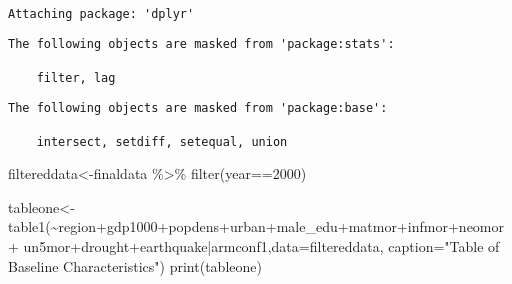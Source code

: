 \documentclass[
  letterpaper,
  DIV=11,
  numbers=noendperiod]{scrartcl}
\newenvironment{Shaded}{\begin{snugshade}}{\end{snugshade}}
\newcommand{\AttributeTok}[1]{\textcolor[rgb]{0.40,0.45,0.13}{#1}}
\newcommand{\DecValTok}[1]{\textcolor[rgb]{0.68,0.00,0.00}{#1}}
\newcommand{\FunctionTok}[1]{\textcolor[rgb]{0.28,0.35,0.67}{#1}}
\newcommand{\NormalTok}[1]{\textcolor[rgb]{0.00,0.23,0.31}{#1}}
\newcommand{\OtherTok}[1]{\textcolor[rgb]{0.00,0.23,0.31}{#1}}
\newcommand{\SpecialCharTok}[1]{\textcolor[rgb]{0.37,0.37,0.37}{#1}}
\newcommand{\StringTok}[1]{\textcolor[rgb]{0.13,0.47,0.30}{#1}}
\begin{document}
\begin{verbatim}

Attaching package: 'dplyr'
\end{verbatim}

\begin{verbatim}
The following objects are masked from 'package:stats':

    filter, lag
\end{verbatim}

\begin{verbatim}
The following objects are masked from 'package:base':

    intersect, setdiff, setequal, union
\end{verbatim}

\begin{Shaded}
\begin{Highlighting}[]
\NormalTok{filtereddata}\OtherTok{\textless{}{-}}\NormalTok{finaldata }\SpecialCharTok{\%\textgreater{}\%} \FunctionTok{filter}\NormalTok{(year}\SpecialCharTok{==}\DecValTok{2000}\NormalTok{)}

\NormalTok{tableone}\OtherTok{\textless{}{-}}\FunctionTok{table1}\NormalTok{(}\SpecialCharTok{\textasciitilde{}}\NormalTok{region}\SpecialCharTok{+}\NormalTok{gdp1000}\SpecialCharTok{+}\NormalTok{popdens}\SpecialCharTok{+}\NormalTok{urban}\SpecialCharTok{+}\NormalTok{male\_edu}\SpecialCharTok{+}\NormalTok{matmor}\SpecialCharTok{+}\NormalTok{infmor}\SpecialCharTok{+}\NormalTok{neomor}\SpecialCharTok{+}
\NormalTok{                   un5mor}\SpecialCharTok{+}\NormalTok{drought}\SpecialCharTok{+}\NormalTok{earthquake}\SpecialCharTok{|}\NormalTok{armconf1,}\AttributeTok{data=}\NormalTok{filtereddata,}
                 \AttributeTok{caption=}\StringTok{"Table of Baseline Characteristics"}\NormalTok{)}
\FunctionTok{print}\NormalTok{(tableone)}
\end{Highlighting}
\end{Shaded}
\end{document}
